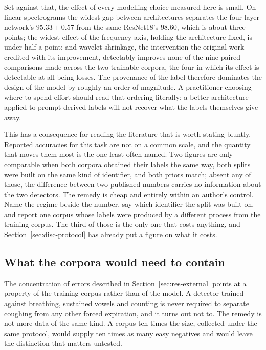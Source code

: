 Set against that, the effect of every modelling choice measured here is small. On linear
spectrograms the widest gap between architectures separates the four layer network's
$95.33 \pm 0.57$ from the same ResNet18's $98.60$, which is about three points; the widest
effect of the frequency axis, holding the architecture fixed, is under half a point; and
wavelet shrinkage, the intervention the original work credited with its improvement,
detectably improves none of the nine paired comparisons made across the two trainable
corpora, the four in which its effect is detectable at all being losses. The provenance of the label
therefore dominates the design of the model by roughly an order of magnitude. A
practitioner choosing where to spend effort
should read that ordering literally: a better architecture applied to prompt derived
labels will not recover what the labels themselves give away.

This has a consequence for reading the literature that is worth stating bluntly. Reported
accuracies for this task are not on a common scale, and the quantity that moves them most
is the one least often named. Two figures are only comparable when both corpora obtained
their labels the same way, both splits were built on the same kind of identifier, and both
priors match; absent any of those, the difference between two published numbers carries no
information about the two detectors. The remedy is cheap and entirely within an author's
control. Name the regime beside the number, say which identifier the split was built on,
and report one corpus whose labels were produced by a different process from the training
corpus. The third of those is the only one that costs anything, and
Section~\ref{sec:disc-protocol} has already put a figure on what it costs.

\subsection{What the corpora would need to contain}\label{sec:disc-corpora}

The concentration of errors described in Section~\ref{sec:res-external} points at a
property of the training corpus rather than of the model. A detector trained against
breathing, sustained vowels and counting is never required to separate coughing from any
other forced expiration, and it turns out not to. The remedy is not more data of the same
kind. A corpus ten times the size, collected under the same protocol, would supply ten
times as many easy negatives and would leave the distinction that matters untested.

